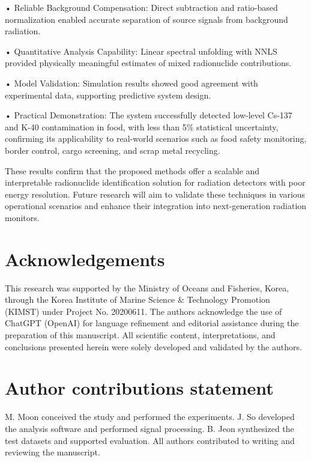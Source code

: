 \documentclass[10pt]{wlscirep}
\begin{document}
• Reliable Background Compensation: Direct subtraction and ratio-based normalization enabled accurate separation of source signals from background radiation.

• Quantitative Analysis Capability: Linear spectral unfolding with NNLS provided physically meaningful estimates of mixed radionuclide contributions.

• Model Validation: Simulation results showed good agreement with experimental data, supporting predictive system design.

• Practical Demonstration: The system successfully detected low-level Cs-137 and K-40 contamination in food, with less than 5\% statistical uncertainty, confirming its applicability to real-world scenarios such as food safety monitoring, border control, cargo screening, and scrap metal recycling.

These results confirm that the proposed methods offer a scalable and interpretable radionuclide identification solution for radiation detectors with poor energy resolution. Future research will aim to validate these techniques in various operational scenarios and enhance their integration into next-generation radiation monitors.




\section*{Acknowledgements}

This research was supported by the Ministry of Oceans and Fisheries, Korea, through the Korea Institute of Marine Science \& Technology Promotion (KIMST) under Project No. 20200611. The authors acknowledge the use of ChatGPT (OpenAI) for language refinement and editorial assistance during the preparation of this manuscript. All scientific content, interpretations, and conclusions presented herein were solely developed and validated by the authors.

\section*{Author contributions statement}
M. Moon conceived the study and performed the experiments. J. So developed the analysis software and performed signal processing. B. Jeon synthesized the test datasets and supported evaluation. All authors contributed to writing and reviewing the manuscript.
\end{document}
